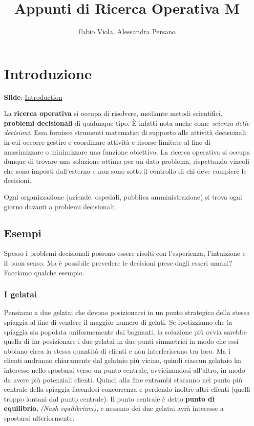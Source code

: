 \documentclass[11pt]{book}
\title{Appunti di Ricerca Operativa M}
\author{Fabio Viola, Alessandra Persano}
\date{}
\begin{document}
\setcounter{chapter}{0}

\chapter{Introduzione}

\scriptsize
{\bf Slide}: \href{http://www.or.deis.unibo.it/staff_pages/martello/Chapter1.zip}{Introduction}
\normalsize
\vspace{20 pt}

La {\bf ricerca operativa} si occupa di risolvere, mediante metodi
scientifici, {\bf problemi decisionali} di qualunque tipo. \`E infatti
nota anche come {\em scienza delle decisioni}. Essa fornisce strumenti
matematici di supporto alle attivit\`a decisionali in cui occorre
gestire e coordinare attivit\`a e risorse limitate al fine di
massimizzare o minimizzare una funzione obiettivo. La ricerca
operativa si occupa dunque di trovare una soluzione ottima per un dato
problema, rispettando vincoli che sono imposti dall'esterno e non sono
sotto il controllo di chi deve compiere le decisioni.

Ogni organizzazione (aziende, ospedali, pubblica amministrazione) si
trova ogni giorno davanti a problemi decisionali.

\section{Esempi} 

Spesso i problemi decisionali possono essere risolti con l'esperienza,
l'in\-tui\-zio\-ne e il buon senso. Ma \`e possibile prevedere le decisioni
prese dagli esseri umani? Facciamo qualche esempio.

\subsection{I gelatai}
Pensiamo a due gelatai che devono posizionarsi in un punto strategico
della stessa spiaggia al fine di vendere il maggior numero di
gelati. Se ipotizziamo che la spiaggia sia popolata uniformemente dai
bagnanti, la soluzione pi\`u ovvia sarebbe quella di far posizionare i
due gelatai in due punti simmetrici in modo che essi abbiano circa la
stessa quantit\`a di clienti e non interferiscano tra loro. Ma i
clienti andranno chiaramente dal gelataio pi\`u vicino, quindi ciascun
gelataio ha interesse nello spostarsi verso un punto centrale,
avvicinandosi all'altro, in modo da avere pi\`u potenziali
clienti. Quindi alla fine entrambi staranno nel punto pi\`u centrale
della spiaggia facendosi concorrenza e perdendo inoltre altri clienti
(quelli troppo lontani dal punto centrale). Il punto centrale \`e detto
{\bf punto di equilibrio}, {\em (Nash equilibrium)}, e nessuno dei due
gelatai avr\`a interesse a spostarsi ulteriormente. 
\end{document}
